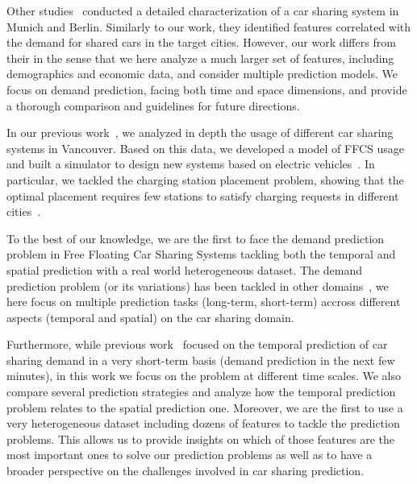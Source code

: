 Other studies~\citep{schmoller2014analyzing,Schmoller2015} conducted a detailed characterization of a car sharing system in Munich and Berlin. Similarly to our work, they identified features correlated with the demand for shared cars in the target cities. However, our work differs from their in the sense that we here analyze a much larger set of features, including demographics and economic data, and consider multiple prediction models. We focus on demand prediction, facing both time and space dimensions, and provide a thorough comparison and guidelines for future directions.

In our previous work~\citep{VancouverCS}, we analyzed in depth the usage of different car sharing systems in Vancouver. Based on this data, we developed a model of FFCS usage and built a simulator to design new systems based on electric vehicles~\citep{coccacar}. In particular, we tackled the charging station placement problem, showing that the optimal placement requires few stations to satisfy charging requests in different cities~\citep{coccaopt}.  

To the best of our knowledge, we are the first to face the demand prediction problem in Free Floating Car Sharing Systems tackling both the temporal and spatial prediction with a real world heterogeneous dataset. The demand prediction problem (or its variations) has been tackled in other domains~\citep{He:2019,Hulot:2018}, we here focus on multiple prediction tasks (long-term, short-term) accross different aspects (temporal and spatial) on the car sharing domain.


Furthermore, while previous work~\citep{wang2017deepsd} focused on the temporal prediction of car sharing demand in a very short-term basis (demand prediction in the next few minutes), in this work we focus on the problem at different time scales. We also compare several prediction strategies and analyze how the temporal prediction problem relates to the spatial prediction one.
Moreover, we are the first to use a very heterogeneous dataset including dozens of features to tackle the prediction problems. This allows us to provide insights on which of those features are the most important ones to solve our prediction problems as well as to have a broader perspective on the challenges involved in car sharing prediction.
